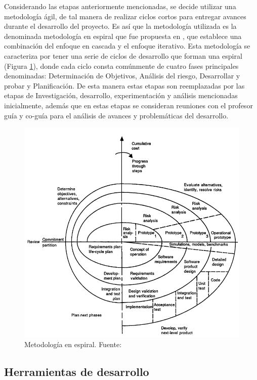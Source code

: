 Considerando las etapas anteriormente mencionadas, se decide utilizar una metodología ágil, de tal manera de realizar ciclos cortos para entregar avances durante el desarrollo del proyecto. Es así que la metodología utilizada es la denominada metodología en espiral que fue propuesta en \cite{10.1145/12944.12948}, que establece una combinación del enfoque en cascada y el enfoque iterativo. Esta metodología se caracteriza por tener una serie de ciclos de desarrollo que forman una espiral (Figura \ref{fig:spiral_method}), donde cada ciclo consta comúnmente de cuatro fases principales denominadas: Determinación de Objetivos, Análisis del riesgo, Desarrollar y probar y Planificación. De esta manera estas etapas son reemplazadas por las etapas de Investigación, desarrollo, experimentación y análisis mencionadas inicialmente, además que en estas etapas se consideran reuniones con el profesor guía y co-guía para el análisis de avances y problemáticas del desarrollo. 

\begin{figure}[!ht]
	\centering
	\captionsetup{justification=centering}
	\includegraphics[scale=0.4]{images/Hoen_spiral.png}
	\caption[Metodología en espiral]{Metodología en espiral. Fuente: \citep{10.1145/12944.12948}}
	\label{fig:spiral_method}
\end{figure}

\subsection{Herramientas de desarrollo}

